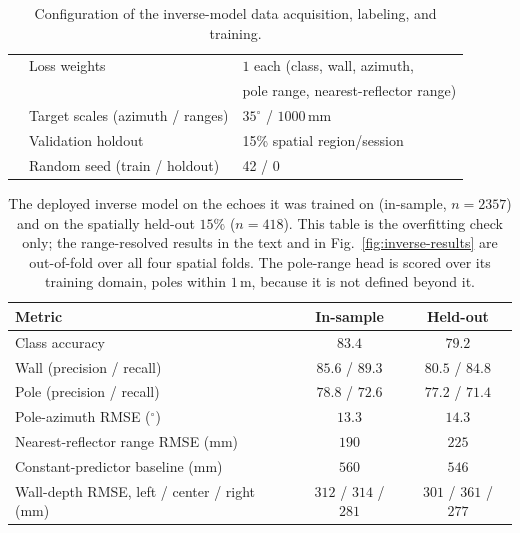 \documentclass[11pt]{article}
\begin{document}
\begin{table}[htb]
\begin{tabular}{lll}
             & Loss weights                      & $1$ each (class, wall, azimuth, \\
             &                                   & pole range, nearest-reflector range) \\
             & Target scales (azimuth / ranges)  & $35^{\circ}$ / $1000$\,mm \\
             & Validation holdout                & 15\% spatial region/session \\
             & Random seed (train / holdout)     & 42 / 0 \\
\hline
\end{tabular}
\caption{Configuration of the inverse-model data acquisition, labeling, and training.}
\label{tab:inverse-params}
\end{table}

\begin{table}[ht]
\centering
\begin{tabular}{lcc}
\hline
\textbf{Metric} & \textbf{In-sample} & \textbf{Held-out} \\
\hline
Class accuracy                               & $83.4$ & $79.2$ \\
\quad Wall (precision / recall)              & $85.6$ / $89.3$ & $80.5$ / $84.8$ \\
\quad Pole (precision / recall)              & $78.8$ / $72.6$ & $77.2$ / $71.4$ \\
Pole-azimuth RMSE ($^{\circ}$)               & $13.3$ & $14.3$ \\
Nearest-reflector range RMSE (mm)            & $190$ & $225$ \\
\quad Constant-predictor baseline (mm)       & $560$ & $546$ \\
Wall-depth RMSE, left / center / right (mm)  & $312$ / $314$ / $281$ & $301$ / $361$ / $277$ \\
\hline
\end{tabular}
\caption{The deployed inverse model on the echoes it was trained on (in-sample, $n=2357$) and on the spatially held-out $15\%$ ($n=418$). This table is the overfitting check only; the range-resolved results in the text and in Fig.~\ref{fig:inverse-results} are out-of-fold over all four spatial folds. The pole-range head is scored over its training domain, poles within $1$\,m, because it is not defined beyond it.}
\label{tab:inverse-results}
\end{table}
\end{document}
